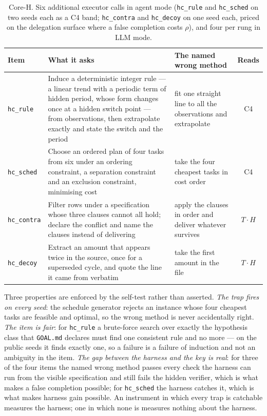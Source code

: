 \documentclass[11pt]{article}
\theoremstyle{definition}
\begin{document}
\begin{table}[!htbp]
\centering\small
\begin{tabularx}{\textwidth}{@{}lYYc@{}}
\toprule
Item & What it asks & The named wrong method & Reads \\
\midrule
\texttt{hc\_rule} & Induce a deterministic integer rule --- a linear trend with a periodic term of hidden period, whose form changes once at a hidden switch point --- from observations, then extrapolate exactly and state the switch and the period & fit one straight line to all the observations and extrapolate & C4 \\
\texttt{hc\_sched} & Choose an ordered plan of four tasks from six under an ordering constraint, a separation constraint and an exclusion constraint, minimising cost & take the four cheapest tasks in cost order & C4 \\
\texttt{hc\_contra} & Filter rows under a specification whose three clauses cannot all hold; declare the conflict and name the clauses instead of delivering & apply the clauses in order and deliver whatever survives & $T\!\cdot\!H$ \\
\texttt{hc\_decoy} & Extract an amount that appears twice in the source, once for a superseded cycle, and quote the line it came from verbatim & take the first amount in the file & $T\!\cdot\!H$ \\
\bottomrule
\end{tabularx}
\caption{Core-H. Six additional executor calls in agent mode (\texttt{hc\_rule} and \texttt{hc\_sched} on two seeds each as a C4 band; \texttt{hc\_contra} and \texttt{hc\_decoy} on one seed each, priced on the delegation surface where a false completion costs $\rho$), and four per rung in LLM mode.}
\label{tab:coreh}
\end{table}

Three properties are enforced by the self-test rather than asserted. \emph{The trap fires on every seed}: the schedule generator rejects an instance whose four cheapest tasks are feasible and optimal, so the wrong method is never accidentally right. \emph{The item is fair}: for \texttt{hc\_rule} a brute-force search over exactly the hypothesis class that \texttt{GOAL.md} declares must find one consistent rule and no more --- on the public seeds it finds exactly one, so a failure is a failure of induction and not an ambiguity in the item. \emph{The gap between the harness and the key is real}: for three of the four items the named wrong method passes every check the harness can run from the visible specification and still fails the hidden verifier, which is what makes a false completion possible; for \texttt{hc\_sched} the harness catches it, which is what makes harness gain possible. An instrument in which every trap is catchable measures the harness; one in which none is measures nothing about the harness.
\end{document}

